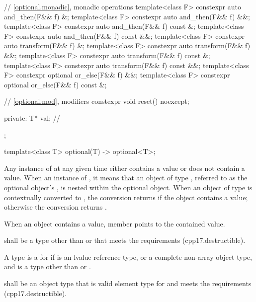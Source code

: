 \begin{codeblock}
{{    // \ref{optional.monadic}, monadic operations
    template<class F> constexpr auto and_then(F&& f) &;
    template<class F> constexpr auto and_then(F&& f) &&;
    template<class F> constexpr auto and_then(F&& f) const &;
    template<class F> constexpr auto and_then(F&& f) const &&;
    template<class F> constexpr auto transform(F&& f) &;
    template<class F> constexpr auto transform(F&& f) &&;
    template<class F> constexpr auto transform(F&& f) const &;
    template<class F> constexpr auto transform(F&& f) const &&;
    template<class F> constexpr optional or_else(F&& f) &&;
    template<class F> constexpr optional or_else(F&& f) const &;

    // \ref{optional.mod}, modifiers
    constexpr void reset() noexcept;

  private:
    T* val;         // \expos
  };

  template<class T>
    optional(T) -> optional<T>;
}
\end{codeblock}

\pnum
Any instance of  at any given time either contains a value or does not contain a value.
When an instance of  ,
it means that an object of type , referred to as the optional object's ,
is nested within the optional object.
When an object of type  is contextually converted to ,
the conversion returns  if the object contains a value;
otherwise the conversion returns .

\pnum
When an  object contains a value,
member  points to the contained value.

\begin{removedblock}
 shall be a  type
other than \cv{}  or \cv{} 
that meets the  requirements (cpp17.destructible).
\end{removedblock}

\begin{addedblock}
\pnum
A type  is a  for  if  is an lvalue reference type,
or a complete non-array object type, and  is a type other than  or .

\pnum
{} shall be an object type that is valid element type for  and meets the  requirements (cpp17.destructible).
\end{addedblock}


